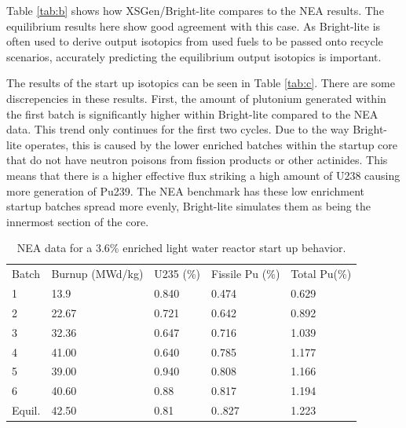 \documentclass{article}
\begin{document}
Table \ref{tab:b} shows how XSGen/Bright-lite compares to the NEA results. The equilibrium results here show good agreement with this case. As Bright-lite is often used to derive output isotopics from used fuels to be passed onto recycle scenarios, accurately predicting the equilibrium output isotopics is important.

The results of the start up isotopics can be seen in Table \ref{tab:c}. There are some discrepencies in these results. First, the amount of plutonium generated within the first batch is significantly higher within Bright-lite compared to the NEA data. This trend only continues for the first two cycles. Due to the way Bright-lite operates, this is caused by the lower enriched batches within the startup core that do not have neutron poisons from fission products or other actinides. This means that there is a higher effective flux striking a high amount of U238 causing more generation of Pu239. The NEA benchmark has these low enrichment startup batches spread more evenly, Bright-lite simulates them as being the innermost section of the core. 

\begin{table}[!htb]
\centering
\caption{NEA data for a 3.6\% enriched light water reactor start up behavior.}
\label{tab:d}
\begin{tabular}{lllll}
Batch & Burnup (MWd/kg) & U235 (\%) & Fissile Pu (\%) & Total Pu(\%) \\
1 & 13.9 & 0.840 & 0.474 & 0.629 \\
2 & 22.67 & 0.721 & 0.642 & 0.892 \\
3 & 32.36 & 0.647 & 0.716 & 1.039 \\
4 & 41.00 & 0.640 & 0.785 & 1.177 \\
5 & 39.00 & 0.940 & 0.808 & 1.166 \\
6 & 40.60 & 0.88 & 0.817 & 1.194 \\
Equil. & 42.50 & 0.81 & 0..827 & 1.223
\end{tabular}
\end{table}
\end{document}

